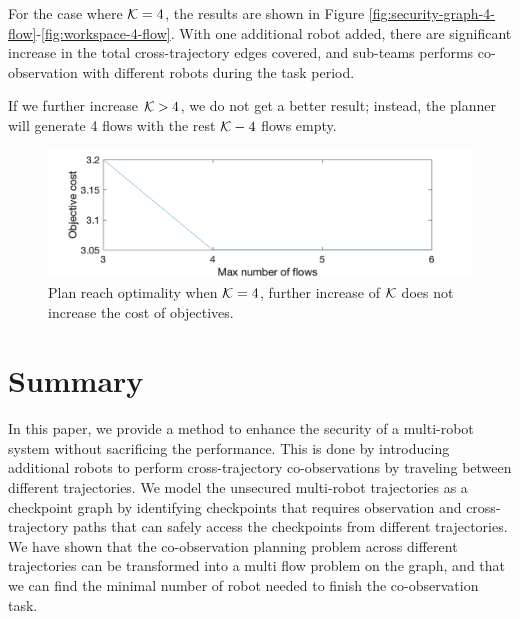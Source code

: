 \documentclass[journal]{IEEEtran}  %
\begin{document}
For the case where $\mathcal{K}=4$, the results are shown in Figure \ref{fig:security-graph-4-flow}-\ref{fig:workspace-4-flow}. With one additional robot added, there are significant increase in the total cross-trajectory edges covered, and sub-teams performs co-observation with different robots during the task period.

If we further increase $\mathcal{K}>4$, we do not get a better result; instead, the planner will generate 4 flows with the rest $\mathcal{K}-4$ flows empty.

\begin{figure}[htbp]
\begin{center}
\includegraphics[width=0.6\linewidth]{nflow_vs_cost}
\caption{Plan reach optimality when $\mathcal{K}=4$, further increase of $\mathcal{K}$ does not increase the cost of objectives.}
\label{fig:flow-n-vs-cost}
\end{center}
\end{figure}

\section{Summary}
In this paper, we provide a method to enhance the security of a multi-robot system without sacrificing the performance. This is done by introducing additional robots to perform cross-trajectory co-observations by traveling between different trajectories. We model the unsecured multi-robot trajectories as a checkpoint graph by identifying checkpoints that requires observation and cross-trajectory paths that can safely access the checkpoints from different trajectories. We have shown that the co-observation planning problem across different trajectories can be transformed into a multi flow problem on the graph, and that we can find the minimal number of robot needed to finish the co-observation task.

\appendix
\end{document}
